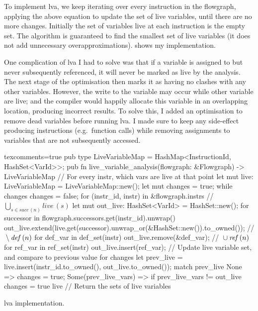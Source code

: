 \documentclass[00-main.tex]{subfiles}
\begin{document}
To implement \gls{lva}, we keep iterating over every instruction in the flowgraph, applying the above equation to update the set of live variables, until there are no more changes.
Initially the set of variables live at each instruction is the empty set.
The algorithm is guaranteed to find the smallest set of live variables (it does not add unnecessary overapproximations).
 shows my implementation.

One complication of \gls{lva} I had to solve was that if a variable is assigned to but never subsequently referenced, it will never be marked as live by the analysis.
The next stage of the optimisation then marks it as having no clashes with any other variables.
However, the write to the variable may occur while other variable are live; and the compiler would happily allocate this variable in an overlapping location, producing incorrect results.
To solve this, I added an optimisation to remove dead variables before running \gls{lva}.
I made sure to keep any side-effect producing instructions (e.g.\ function calls) while removing assignments to variables that are not subsequently accessed.

\begin{listing}[H]
  \begin{RustListing*}{texcomments=true}
    pub type LiveVariableMap = HashMap<InstructionId, HashSet<VarId>>;
    pub fn live_variable_analysis(flowgraph: &Flowgraph) -> LiveVariableMap {
        // For every instr, which vars are live at that point
        let mut live: LiveVariableMap = LiveVariableMap::new();
        let mut changes = true;
        while changes {
            changes = false;
            for (instr_id, instr) in &flowgraph.instrs {
                // $\bigcup_{s \in \mathit{succ}\,(n)} \mathit{live}\,(s)$
                let mut out_live: HashSet<VarId> = HashSet::new();
                for successor in flowgraph.successors.get(instr_id).unwrap() {
                    out_live.extend(live.get(successor).unwrap_or(&HashSet::new()).to_owned());
                }
                // ${} \setminus \lvadef\,(n)$
                for def_var in def_set(instr) {
                    out_live.remove(&def_var);
                }
                // ${} \cup \lvaref\,(n)$
                for ref_var in ref_set(instr) {
                    out_live.insert(ref_var);
                }
                // Update live variable set, and compare to previous value for changes
                let prev_live = live.insert(instr_id.to_owned(), out_live.to_owned());
                match prev_live {
                    None => {
                        changes = true;
                    }
                    Some(prev_live_vars) => {
                        if prev_live_vars != out_live {
                            changes = true
                        }
                    }
                }
            }
        }
        live // Return the sets of live variables
    }
  \end{RustListing*}
  \caption{\Acrlong{lva} implementation.}
  \label{lst:lva implementation}
\end{listing}
\end{document}
